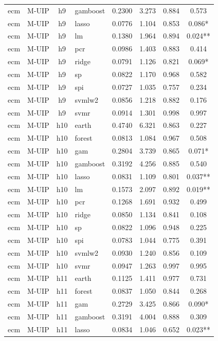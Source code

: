 \begin{ThreePartTable}
\begin{longtable}[t]{llclcccc}
ecm & M-UIP & h9 & gamboost & 0.2300 & 3.273 & 0.884 & 0.573\\
ecm & M-UIP & h9 & lasso & 0.0776 & 1.104 & 0.853 & 0.086*\\
ecm & M-UIP & h9 & lm & 0.1380 & 1.964 & 0.894 & 0.024**\\
ecm & M-UIP & h9 & pcr & 0.0986 & 1.403 & 0.883 & 0.414\\
ecm & M-UIP & h9 & ridge & 0.0791 & 1.126 & 0.821 & 0.069*\\
ecm & M-UIP & h9 & sp & 0.0822 & 1.170 & 0.968 & 0.582\\
ecm & M-UIP & h9 & spi & 0.0727 & 1.035 & 0.757 & 0.234\\
ecm & M-UIP & h9 & svmlw2 & 0.0856 & 1.218 & 0.882 & 0.176\\
ecm & M-UIP & h9 & svmr & 0.0914 & 1.301 & 0.998 & 0.997\\
\addlinespace
ecm & M-UIP & h10 & earth & 0.4740 & 6.321 & 0.863 & 0.227\\
ecm & M-UIP & h10 & forest & 0.0813 & 1.084 & 0.967 & 0.508\\
ecm & M-UIP & h10 & gam & 0.2804 & 3.739 & 0.865 & 0.071*\\
ecm & M-UIP & h10 & gamboost & 0.3192 & 4.256 & 0.885 & 0.540\\
ecm & M-UIP & h10 & lasso & 0.0831 & 1.109 & 0.801 & 0.037**\\
ecm & M-UIP & h10 & lm & 0.1573 & 2.097 & 0.892 & 0.019**\\
ecm & M-UIP & h10 & pcr & 0.1268 & 1.691 & 0.932 & 0.499\\
ecm & M-UIP & h10 & ridge & 0.0850 & 1.134 & 0.841 & 0.108\\
ecm & M-UIP & h10 & sp & 0.0822 & 1.096 & 0.948 & 0.225\\
ecm & M-UIP & h10 & spi & 0.0783 & 1.044 & 0.775 & 0.391\\
ecm & M-UIP & h10 & svmlw2 & 0.0930 & 1.240 & 0.856 & 0.109\\
ecm & M-UIP & h10 & svmr & 0.0947 & 1.263 & 0.997 & 0.995\\
\addlinespace
ecm & M-UIP & h11 & earth & 0.1125 & 1.411 & 0.977 & 0.731\\
ecm & M-UIP & h11 & forest & 0.0837 & 1.050 & 0.844 & 0.268\\
ecm & M-UIP & h11 & gam & 0.2729 & 3.425 & 0.866 & 0.090*\\
ecm & M-UIP & h11 & gamboost & 0.3191 & 4.004 & 0.888 & 0.309\\
ecm & M-UIP & h11 & lasso & 0.0834 & 1.046 & 0.652 & 0.023**\\

\end{longtable}
\end{ThreePartTable}
